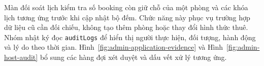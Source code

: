 Màn đối soát lịch kiểm tra số booking còn giữ chỗ của một phòng và các khóa lịch tương ứng trước khi cập nhật bộ đếm. Chức năng này phục vụ trường hợp dữ liệu cũ cần đối chiếu, không tạo thêm phòng hoặc thay đổi hình thức thuê. Nhóm nhật ký đọc \texttt{auditLogs} để hiển thị người thực hiện, đối tượng, hành động và lý do theo thời gian. Hình~\ref{fig:admin-application-evidence} và Hình~\ref{fig:admin-host-audit} bổ sung các hàng đợi xét duyệt và dấu vết xử lý tương ứng.


